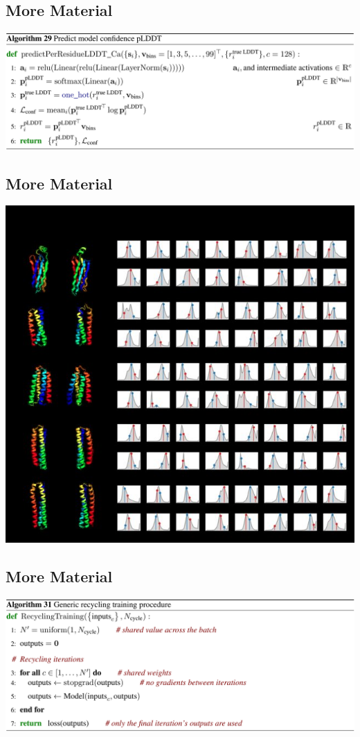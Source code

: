\documentclass[presentation, smaller]{beamer}
\begin{document}
\subsection*{More Material}
\label{sec:orgc45b495}
\begin{center}
\includegraphics[width=.9\linewidth]{./imgs/confidence-pLDDT-algo29.png}
\end{center}
\subsection*{More Material}
\label{sec:orgebc93e6}
\begin{center}
\includegraphics[width=.9\linewidth]{./imgs/Examples-of-distograms-from-trRosetta.jpg}
\end{center}
\subsection*{More Material}
\label{sec:orgaadb192}
\begin{center}
\includegraphics[width=.9\linewidth]{./imgs/generic-recycling-algo31.png}
\end{center}
\end{document}
